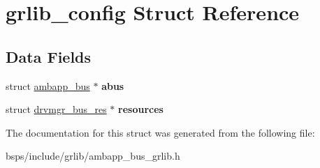 \hypertarget{structgrlib__config}{}\section{grlib\+\_\+config Struct Reference}
\label{structgrlib__config}
\subsection*{Data Fields}
\begin{DoxyCompactItemize}
\item 
\mbox{\label{structgrlib__config_ac09ad167711710c8a7af83bc8ac8c41e}} 
struct \mbox{\hyperlink{structambapp__bus}{ambapp\+\_\+bus}} $\ast$ {\bfseries abus}
\item 
\mbox{\label{structgrlib__config_a8680f0b05a02b523b303d8c09dfae1f8}} 
struct \mbox{\hyperlink{structdrvmgr__bus__res}{drvmgr\+\_\+bus\+\_\+res}} $\ast$ {\bfseries resources}
\end{DoxyCompactItemize}


The documentation for this struct was generated from the following file\+:\begin{DoxyCompactItemize}
\item 
bsps/include/grlib/ambapp\+\_\+bus\+\_\+grlib.\+h\end{DoxyCompactItemize}
